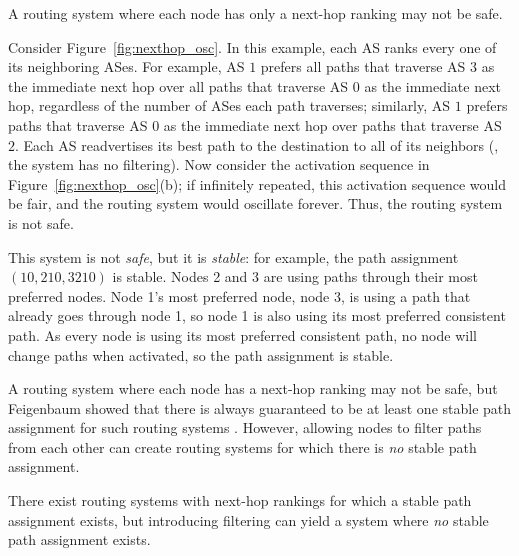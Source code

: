 

\begin{observation}
A routing system where each node has only a next-hop ranking may
not be safe.
\end{observation}

\begin{example}
Consider Figure~\ref{fig:nexthop_osc}.  In this example,
each AS ranks every one of its neighboring ASes.
For example, AS $1$ prefers all paths that traverse AS $3$ as the
immediate next hop over all paths that traverse AS $0$ as the immediate
next hop, regardless of the number of ASes each path traverses;
similarly, AS $1$ prefers paths that traverse AS $0$ as the immediate next hop
over paths that traverse AS $2$.  Each AS readvertises its best path to
the destination to all of its neighbors (\ie, the system has no
filtering).  Now consider the activation sequence in
Figure~\ref{fig:nexthop_osc}(b); if infinitely repeated, this
activation sequence would be fair, and the routing system would
oscillate forever.  Thus, the routing system is not safe.

This system is not {\em safe}, but it is {\em stable}: for
example, the path assignment $(10, 210, 3210)$ is stable.  Nodes
2 and 3 are using paths through their most preferred nodes.  Node 1's
most preferred node, node 3, is using a path that already goes through
node 1, so node 1 is also using its most preferred consistent path.  As
every node is using its most preferred consistent path, no node will
change paths when activated, so the path assignment is stable.
\end{example}

A routing system where each node has a next-hop ranking
may not be safe, but Feigenbaum \ea showed that
there is always 
guaranteed to be at least one stable path assignment for such routing
systems \cite{Feigenbaum2004}.  However, allowing nodes to filter paths from
each other can create routing systems for which there is {\em no}
stable path assignment.


\begin{observation}
There exist routing systems with next-hop
rankings for which a stable path assignment exists, but introducing
filtering can yield a system where {\em no} stable path assignment exists.
\end{observation}


